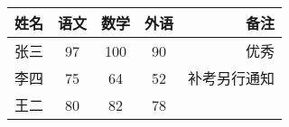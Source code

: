 \documentclass{article}
\begin{document}
	\begin{tabular}{|l | c | c | c | r|}
		\hline
		姓名 & 语文 & 数学 & 外语 & 备注\\
		\hline
		张三 & 97 & 100 & 90 & 优秀\\
		\hline
		李四 & 75 & 64 & 52 & 补考另行通知\\
		\hline
		王二 & 80 & 82 & 78 & \\
		\hline
		
		
		
	\end{tabular}
	
\end{document}
